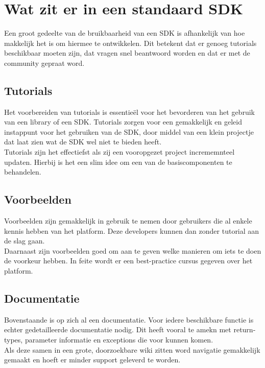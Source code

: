 \chapter{Wat zit er in een standaard SDK}

Een groot gedeelte van de bruikbaarheid van een SDK is afhankelijk van hoe makkelijk het is om hiermee te ontwikkelen. Dit betekent dat er genoeg tutorials beschikbaar moeten zijn, dat vragen snel beantwoord worden en dat er met de community gepraat word.

\section{Tutorials}

Het voorbereiden van tutorials is essentie\"{e}l voor het bevorderen van het gebruik van een library of een SDK. Tutorials zorgen voor een gemakkelijk en geleid instappunt voor het gebruiken van de SDK, door middel van een klein projectje dat laat zien wat de SDK wel niet te bieden heeft. \\

Tutorials zijn het effectiefst als zij een vooropgezet project incrememnteel updaten. Hierbij is het een slim idee om een van de basiscomponenten te behandelen. 

\section{Voorbeelden}

Voorbeelden zijn gemakkelijk in gebruik te nemen door gebruikers die al enkele kennis hebben van het platform. Deze developers kunnen dan zonder tutorial aan de slag gaan. \\

Daarnaast zijn voorbeelden goed om aan te geven welke manieren om iets te doen de voorkeur hebben. In feite wordt er een best-practice cursus gegeven over het platform.


\section{Documentatie}

Bovenstaande is op zich al een documentatie. Voor iedere beschikbare functie is echter gedetailleerde documentatie nodig. Dit heeft vooral te amekn met return-types, parameter informatie en exceptions die voor kunnen komen. \\

Als deze samen in een grote, doorzoekbare wiki zitten word navigatie gemakkelijk gemaakt en hoeft er minder support geleverd te worden.


